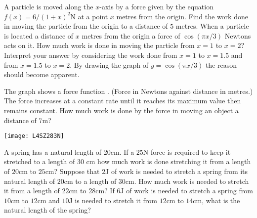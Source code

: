\begin{Exercise}[title={Applications},label=exApp]
\Question A particle is moved along the $x$-axis by a force given by the equation $f (x) =6/\left (1 +x\right )^{2} \mbox{N}$ at a point $x$ metres from the origin. Find the work done in moving the particle from the origin to a distance of $5$ metres. 
\Question When a particle is located a distance of $x$ metres from the origin a force of $\cos  \left (\pi  x/3\right )$ Newtons acts on it. How much work is done in moving the particle from $x =1$ to $x =2$? Interpret your answer by considering the work done from $x =1$ to $x =1.5$ and from $x =1.5$ to $x =2$. By drawing the graph of $y =\cos  \left (\pi  x/3\right )$ the reason should become apparent. 
\Question 
\columnsep =30pt
\begin{multicols}{2}
The graph shows a force function . (Force in Newtons against distance in metres.) The force increases at a constant rate until it reaches its maximum value then remains constant. How much work is done by the force in moving an object a distance of $7 \mbox{m}$?

\texttt{[image: L4SZ283N]}

\end{multicols} 
\Question A spring has a natural length of $20 \mbox{cm}$. If a $25 \mbox{N}$ force is required to keep it stretched to a length of $30$ $\mbox{cm}$ how much work is done stretching it from a length of $20 \mbox{cm}$ to $25 \mbox{cm}$? 
\Question Suppose that $2 \mbox{J}$ of work is needed to stretch a spring from its natural length of $20 \mbox{cm}$ to a length of $30 \mbox{cm}$. How much work is needed to stretch it from a length of $22 \mbox{cm}$ to $28 \mbox{cm}$? 
\Question If $6 \mbox{J}$ of work is needed to stretch a spring from $10 \mbox{cm}$ to $12 \mbox{cm}$ and $10 \mbox{J}$ is needed to stretch it from $12 \mbox{cm}$ to $14 \mbox{cm}$, what is the natural length of the spring? 
\end{Exercise}

